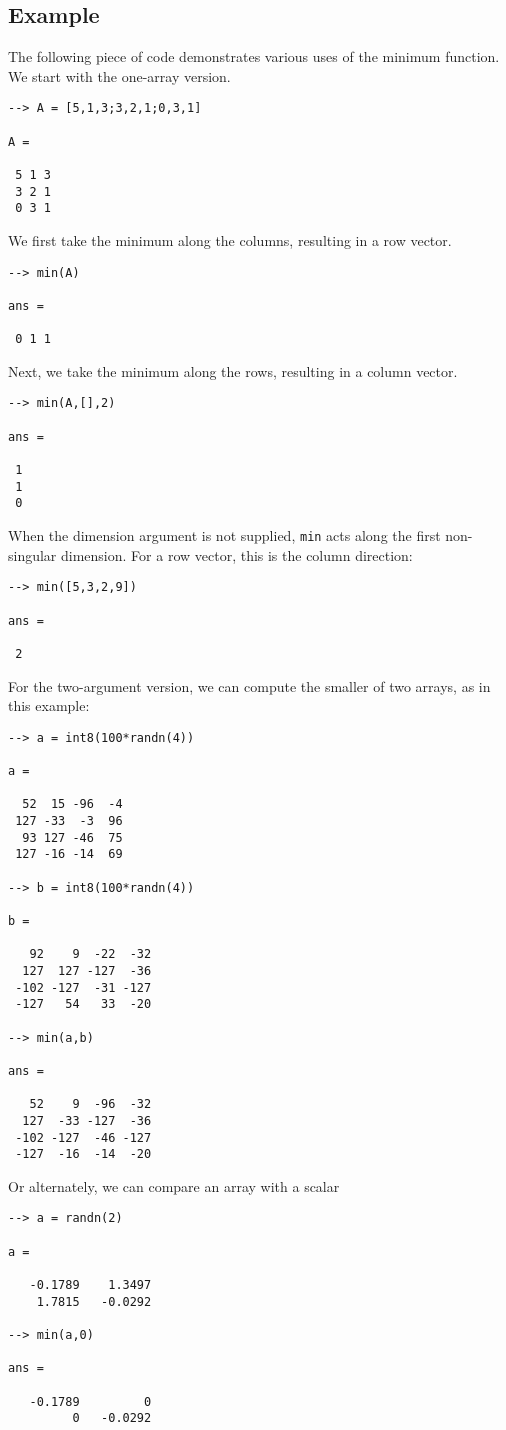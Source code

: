 \subsection{Example}

The following piece of code demonstrates various uses of the minimum
function.  We start with the one-array version.
\begin{verbatim}
--> A = [5,1,3;3,2,1;0,3,1]

A = 

 5 1 3 
 3 2 1 
 0 3 1 
\end{verbatim}
We first take the minimum along the columns, resulting in a row vector.
\begin{verbatim}
--> min(A)

ans = 

 0 1 1 
\end{verbatim}
Next, we take the minimum along the rows, resulting in a column vector.
\begin{verbatim}
--> min(A,[],2)

ans = 

 1 
 1 
 0 
\end{verbatim}
When the dimension argument is not supplied, \verb|min| acts along the first 
non-singular dimension.  For a row vector, this is the column direction:
\begin{verbatim}
--> min([5,3,2,9])

ans = 

 2 
\end{verbatim}

For the two-argument version, we can compute the smaller of two arrays,
as in this example:
\begin{verbatim}
--> a = int8(100*randn(4))

a = 

  52  15 -96  -4 
 127 -33  -3  96 
  93 127 -46  75 
 127 -16 -14  69 

--> b = int8(100*randn(4))

b = 

   92    9  -22  -32 
  127  127 -127  -36 
 -102 -127  -31 -127 
 -127   54   33  -20 

--> min(a,b)

ans = 

   52    9  -96  -32 
  127  -33 -127  -36 
 -102 -127  -46 -127 
 -127  -16  -14  -20 
\end{verbatim}
Or alternately, we can compare an array with a scalar
\begin{verbatim}
--> a = randn(2)

a = 

   -0.1789    1.3497 
    1.7815   -0.0292 

--> min(a,0)

ans = 

   -0.1789         0 
         0   -0.0292 
\end{verbatim}
